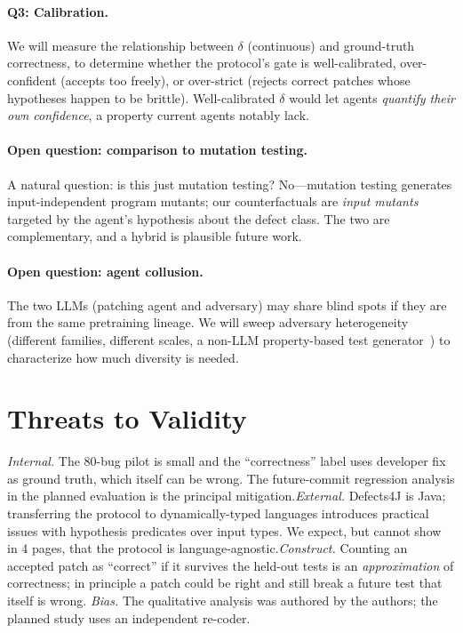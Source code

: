 \documentclass[sigconf,review,anonymous,nonacm]{acmart}
\begin{document}
\paragraph{Q3: Calibration.} We will measure the relationship between
$\delta$ (continuous) and ground-truth correctness, to determine
whether the protocol's gate is well-calibrated, over-confident
(accepts too freely), or over-strict (rejects correct patches whose
hypotheses happen to be brittle). Well-calibrated $\delta$ would let
agents \emph{quantify their own confidence}, a property current agents
notably lack.

\paragraph{Open question: comparison to mutation testing.} A natural
question: is this just mutation testing? No---mutation testing
generates input-independent program mutants; our counterfactuals are
\emph{input mutants} targeted by the agent's hypothesis about the
defect class. The two are complementary, and a hybrid is plausible
future work.

\paragraph{Open question: agent collusion.} The two LLMs (patching
agent and adversary) may share blind spots if they are from the same
pretraining lineage. We will sweep adversary heterogeneity (different
families, different scales, a non-LLM property-based test
generator~\cite{claessen2000quickcheck}) to characterize how much
diversity is needed.

\section{Threats to Validity}
\label{sec:threats}

\noindent\emph{Internal.} The 80-bug pilot is small and the
``correctness'' label uses developer fix as ground truth, which itself
can be wrong. The future-commit regression analysis in the planned
evaluation is the principal mitigation.\;\emph{External.} Defects4J is
Java; transferring the protocol to dynamically-typed languages
introduces practical issues with hypothesis predicates over input
types. We expect, but cannot show in 4 pages, that the protocol is
language-agnostic.\;\emph{Construct.} Counting an accepted patch as
``correct'' if it survives the held-out tests is an
\emph{approximation} of correctness; in principle a patch could be
right and still break a future test that itself is wrong. \emph{Bias.}
The qualitative analysis was authored by the authors; the planned
study uses an independent re-coder.
\end{document}
